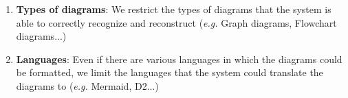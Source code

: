 \documentclass[a4paper,12pt]{article}
\begin{document}
	\begin{enumerate}
	
	\item \textbf{Types of diagrams}: We restrict the types of diagrams that the system is able to correctly recognize and reconstruct (\textit{e.g.} Graph diagrams, Flowchart diagrams...)
	\item \textbf{Languages}: Even if there are various languages in which the diagrams could be formatted, we limit the languages that the system could translate the diagrams to (\textit{e.g.} Mermaid, D2...)
	
	\end{enumerate}
\end{document}
